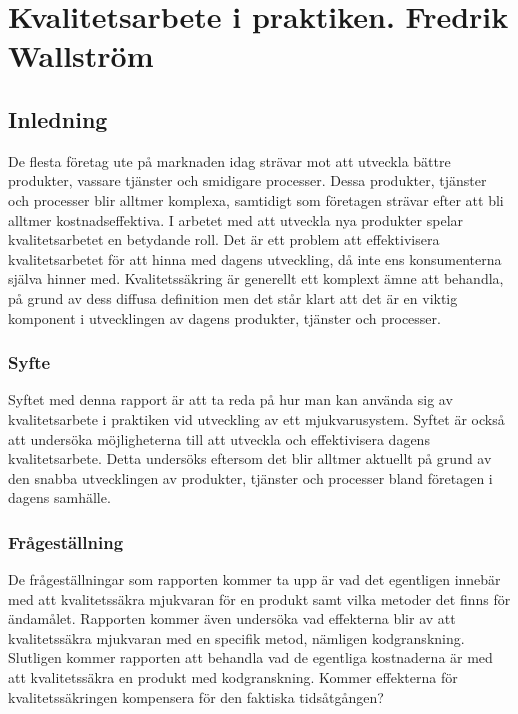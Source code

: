 \chapter{Kvalitetsarbete i praktiken. Fredrik Wallström}
\label{cha:indiv-report-person}

\section{Inledning}
\label{sec:introduction-person}

De flesta företag ute på marknaden idag strävar mot att utveckla bättre produkter, vassare tjänster och smidigare processer. Dessa produkter, tjänster och processer blir alltmer komplexa, samtidigt som företagen strävar efter att bli alltmer kostnadseffektiva. I arbetet med att utveckla nya produkter spelar kvalitetsarbetet en betydande roll. Det är ett problem att effektivisera kvalitetsarbetet för att hinna med dagens utveckling, då inte ens konsumenterna själva hinner med. Kvalitetssäkring är generellt ett komplext ämne att behandla, på grund av dess diffusa definition men det står klart att det är en viktig komponent i utvecklingen av dagens produkter, tjänster och processer.

\subsection{Syfte}
\label{sec:purpose-person}

Syftet med denna rapport är att ta reda på hur man kan använda sig av kvalitetsarbete i praktiken vid utveckling av ett mjukvarusystem. Syftet är också att undersöka möjligheterna till att utveckla och effektivisera dagens kvalitetsarbete. Detta undersöks eftersom det blir alltmer aktuellt på grund av den snabba utvecklingen av produkter, tjänster och processer bland företagen i dagens samhälle.


\subsection{Frågeställning}
\label{sec:issue-person}

De frågeställningar som rapporten kommer ta upp är vad det egentligen innebär med att kvalitetssäkra mjukvaran för en produkt samt vilka metoder det finns för ändamålet.  Rapporten kommer även undersöka vad effekterna blir av att kvalitetssäkra mjukvaran med en specifik metod, nämligen kodgranskning. Slutligen kommer rapporten att behandla vad de egentliga kostnaderna är med att kvalitetssäkra en produkt med kodgranskning. Kommer effekterna för kvalitetssäkringen kompensera för den faktiska tidsåtgången?

